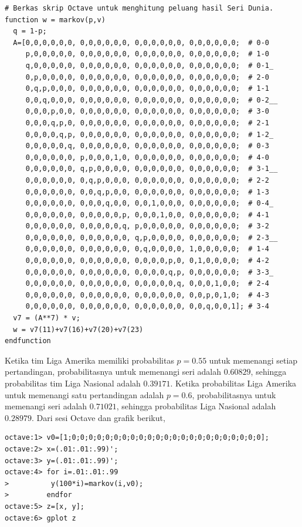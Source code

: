\begin{exercises}
\begin{answer}
\begin{exparts}
\begin{lstlisting}
# Berkas skrip Octave untuk menghitung peluang hasil Seri Dunia.
function w = markov(p,v)
  q = 1-p;
  A=[0,0,0,0,0,0, 0,0,0,0,0,0, 0,0,0,0,0,0, 0,0,0,0,0,0;  # 0-0
     p,0,0,0,0,0, 0,0,0,0,0,0, 0,0,0,0,0,0, 0,0,0,0,0,0;  # 1-0
     q,0,0,0,0,0, 0,0,0,0,0,0, 0,0,0,0,0,0, 0,0,0,0,0,0;  # 0-1_
     0,p,0,0,0,0, 0,0,0,0,0,0, 0,0,0,0,0,0, 0,0,0,0,0,0;  # 2-0
     0,q,p,0,0,0, 0,0,0,0,0,0, 0,0,0,0,0,0, 0,0,0,0,0,0;  # 1-1
     0,0,q,0,0,0, 0,0,0,0,0,0, 0,0,0,0,0,0, 0,0,0,0,0,0;  # 0-2__
     0,0,0,p,0,0, 0,0,0,0,0,0, 0,0,0,0,0,0, 0,0,0,0,0,0;  # 3-0
     0,0,0,q,p,0, 0,0,0,0,0,0, 0,0,0,0,0,0, 0,0,0,0,0,0;  # 2-1
     0,0,0,0,q,p, 0,0,0,0,0,0, 0,0,0,0,0,0, 0,0,0,0,0,0;  # 1-2_
     0,0,0,0,0,q, 0,0,0,0,0,0, 0,0,0,0,0,0, 0,0,0,0,0,0;  # 0-3
     0,0,0,0,0,0, p,0,0,0,1,0, 0,0,0,0,0,0, 0,0,0,0,0,0;  # 4-0
     0,0,0,0,0,0, q,p,0,0,0,0, 0,0,0,0,0,0, 0,0,0,0,0,0;  # 3-1__
     0,0,0,0,0,0, 0,q,p,0,0,0, 0,0,0,0,0,0, 0,0,0,0,0,0;  # 2-2
     0,0,0,0,0,0, 0,0,q,p,0,0, 0,0,0,0,0,0, 0,0,0,0,0,0;  # 1-3
     0,0,0,0,0,0, 0,0,0,q,0,0, 0,0,1,0,0,0, 0,0,0,0,0,0;  # 0-4_
     0,0,0,0,0,0, 0,0,0,0,0,p, 0,0,0,1,0,0, 0,0,0,0,0,0;  # 4-1
     0,0,0,0,0,0, 0,0,0,0,0,q, p,0,0,0,0,0, 0,0,0,0,0,0;  # 3-2
     0,0,0,0,0,0, 0,0,0,0,0,0, q,p,0,0,0,0, 0,0,0,0,0,0;  # 2-3__
     0,0,0,0,0,0, 0,0,0,0,0,0, 0,q,0,0,0,0, 1,0,0,0,0,0;  # 1-4
     0,0,0,0,0,0, 0,0,0,0,0,0, 0,0,0,0,p,0, 0,1,0,0,0,0;  # 4-2
     0,0,0,0,0,0, 0,0,0,0,0,0, 0,0,0,0,q,p, 0,0,0,0,0,0;  # 3-3_
     0,0,0,0,0,0, 0,0,0,0,0,0, 0,0,0,0,0,q, 0,0,0,1,0,0;  # 2-4
     0,0,0,0,0,0, 0,0,0,0,0,0, 0,0,0,0,0,0, 0,0,p,0,1,0;  # 4-3
     0,0,0,0,0,0, 0,0,0,0,0,0, 0,0,0,0,0,0, 0,0,q,0,0,1]; # 3-4
  v7 = (A**7) * v;
  w = v7(11)+v7(16)+v7(20)+v7(23)
endfunction
\end{lstlisting}
       Ketika tim Liga Amerika memiliki probabilitas $p=0.55$ untuk memenangi
       setiap pertandingan, probabilitasnya untuk memenangi seri adalah
       $0.60829$, sehingga probabilitas tim Liga Nasional adalah $0.39171$.
       Ketika probabilitas Liga Amerika untuk memenangi satu pertandingan
       adalah $p=0.6$, probabilitasnya untuk memenangi seri adalah $0.71021$,
       sehingga probabilitas Liga Nasional adalah $0.28979$.
      \partsitem Dari sesi Octave dan grafik berikut,
\begin{lstlisting}
octave:1> v0=[1;0;0;0;0;0;0;0;0;0;0;0;0;0;0;0;0;0;0;0;0;0;0;0];
octave:2> x=(.01:.01:.99)';
octave:3> y=(.01:.01:.99)';
octave:4> for i=.01:.01:.99
>          y(100*i)=markov(i,v0);
>         endfor
octave:5> z=[x, y];
octave:6> gplot z
\end{lstlisting}

\end{exparts}
\end{answer}
\end{exercises}
